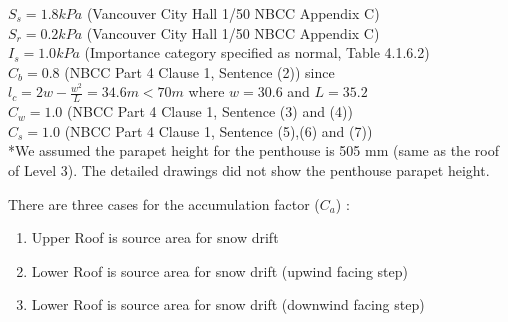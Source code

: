 \documentclass[12pt]{article}
\begin{document}
\noindent$S_{s} = 1.8 kPa$ (Vancouver City Hall 1/50 NBCC Appendix C)\\
$S_{r} = 0.2 kPa$ (Vancouver City Hall 1/50 NBCC Appendix C)\\
$I_{s} = 1.0 kPa$ (Importance category specified as normal, Table 4.1.6.2)\\
$C_{b} = 0.8$ (NBCC Part 4 Clause 1, Sentence (2)) since $l_{c}=2w-\frac{w^2}{L}=34.6m < 70m$ where $w=30.6$ and $L = 35.2$\\
$C_{w} = 1.0$ (NBCC Part 4 Clause 1, Sentence (3) and (4))\\
$C_{s} = 1.0$ (NBCC Part 4 Clause 1, Sentence (5),(6) and (7))\\

*We assumed the parapet height for the penthouse is 505 mm (same as the roof of Level 3). The detailed drawings did not show the penthouse parapet height.

There are three cases for the accumulation factor ($C_{a}$) :
\begin{enumerate}
\item Upper Roof is source area for snow drift
\item Lower Roof is source area for snow drift (upwind facing step)
\item Lower Roof is source area for snow drift (downwind facing step)
\end{enumerate}
\end{document}
